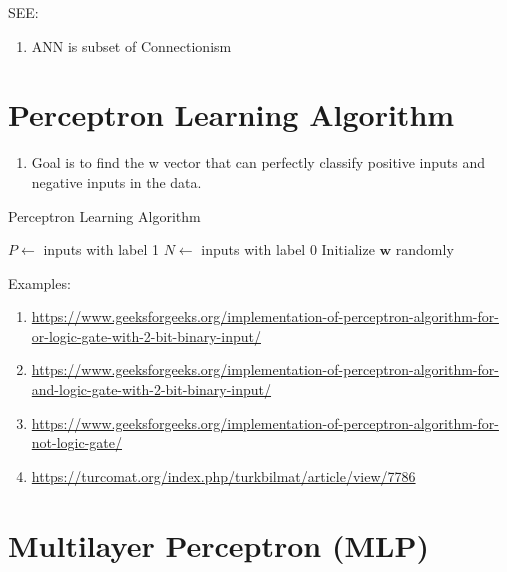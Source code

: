 SEE: 

\begin{enumerate}
    \item ANN is subset of Connectionism
\end{enumerate}


\section{Perceptron Learning Algorithm \cite{medium-perceptron-learning-algorithm}}\label{Perceptron Learning Algorithm}

\begin{enumerate}
    \item Goal is to find the w vector that can perfectly classify positive inputs and negative inputs in the data.
\end{enumerate}

\begin{algorithm}[H]
    \caption{Perceptron Learning Algorithm}
    $P \gets$ inputs with label 1\;
    $N \gets$ inputs with label 0\;
    Initialize $\textbf{w}$ randomly\;
\end{algorithm}

Examples:\\
\begin{enumerate}
    \item \url{https://www.geeksforgeeks.org/implementation-of-perceptron-algorithm-for-or-logic-gate-with-2-bit-binary-input/}
    \item \url{https://www.geeksforgeeks.org/implementation-of-perceptron-algorithm-for-and-logic-gate-with-2-bit-binary-input/}
    \item \url{https://www.geeksforgeeks.org/implementation-of-perceptron-algorithm-for-not-logic-gate/}
    \item \url{https://turcomat.org/index.php/turkbilmat/article/view/7786}
\end{enumerate}



\section{Multilayer Perceptron (MLP) \cite{wiki-Multilayer_perceptron,dnn-1}} \label{Multilayer_perceptron}

